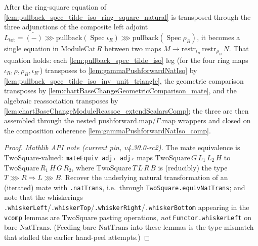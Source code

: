 \begin{lemma}

  \label{lem:pullback_spec_tilde_iso_ring_square_mate_glue}
  After the ring-square equation of \cref{lem:pullback_spec_tilde_iso_ring_square_natural} is
  transposed through the three adjunctions of the composite left adjoint
  \(L_{\mathrm{tot}} = \widetilde{(-)} \ggg \mathrm{pullback}(\operatorname{Spec}\iota_R) \ggg
  \mathrm{pullback}(\operatorname{Spec}\rho_B)\), it becomes a single equation in
  \(\mathrm{ModuleCat}\,R\) between two maps \(M \to \mathrm{restr}_{\iota_R}\,\mathrm{restr}_{\rho_B}\,N\).
  That equation holds: each \cref{lem:pullback_spec_tilde_iso} leg (for the four ring maps
  \(\iota_R,\rho,\rho_B,\iota_{R'}\)) transposes to \cref{lem:gammaPushforwardNatIso} by
  \cref{lem:pullback_spec_tilde_iso_inv_unit_triangle}, the geometric comparison transposes by
  \cref{lem:chartBaseChangeGeometricComparison_mate}, and the algebraic reassociation transposes by
  \cref{lem:chartBaseChangeModuleReassoc_extendScalarsComp}; the three are then assembled through the
  nested \(\mathrm{pushforward}.\mathrm{map}\)/\(\Gamma.\mathrm{map}\) wrappers and closed on the
  composition coherence \cref{lem:gammaPushforwardNatIso_comp}.
  \begin{proof}
    \emph{Mathlib API note (current pin, v4.30.0-rc2).} The mate equivalence is
    \(\mathrm{TwoSquare}\)-valued: \texttt{mateEquiv adj₁ adj₂} maps
    \(\mathrm{TwoSquare}\,G\,L_1\,L_2\,H\) to \(\mathrm{TwoSquare}\,R_1\,H\,G\,R_2\), where
    \(\mathrm{TwoSquare}\,T\,L\,R\,B\) is (reducibly) the type \(T \ggg R \Rightarrow L \ggg B\).
    Recover the underlying natural transformation of an (iterated) mate with \texttt{.natTrans}, i.e.\
    through \texttt{TwoSquare.equivNatTrans}; and note that the whiskerings
    \texttt{.whiskerLeft}/\texttt{.whiskerTop}/\texttt{.whiskerRight}/\texttt{.whiskerBottom}
    appearing in the \texttt{vcomp} lemmas are \(\mathrm{TwoSquare}\) pasting operations, \emph{not}
    \texttt{Functor.whiskerLeft} on bare \(\mathrm{NatTrans}\). (Feeding bare \(\mathrm{NatTrans}\)
    into these lemmas is the type-mismatch that stalled the earlier hand-peel attempts.)


\end{proof}
\end{lemma}

